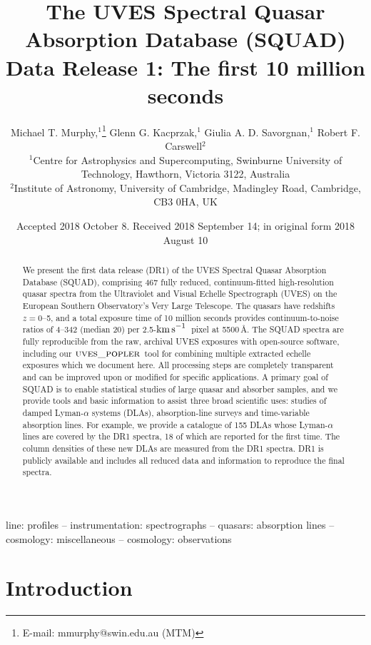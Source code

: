\documentclass[fleqn,usenatbib,usedcolumn]{mnras}
\title[UVES SQUAD Data Release 1]{The UVES Spectral Quasar Absorption Database (SQUAD) Data Release 1: The first 10 million seconds}
\author[M. T. Murphy et al.]{Michael T. Murphy,$^{1}$\thanks{E-mail: mmurphy@swin.edu.au (MTM)} Glenn G. Kacprzak,$^{1}$ Giulia A. D. Savorgnan,$^{1}$\newauthor
Robert F. Carswell$^{2}$\\
  $^{1}$Centre for Astrophysics and Supercomputing, Swinburne University of Technology, Hawthorn, Victoria 3122, Australia\\
  $^{2}$Institute of Astronomy, University of Cambridge, Madingley Road, Cambridge, CB3 0HA, UK
}
\date{Accepted 2018 October 8. Received 2018 September 14; in original form 2018 August 10}
\newcommand{\kms}{\ensuremath{\textrm{km\,s}^{-1}}}
\newcommand{\popler}{\ensuremath{\textsc{uves\_popler}}}
\begin{document}
\label{firstpage}
\pagerange{\pageref{firstpage}--\pageref{lastpage}}
\maketitle

\begin{abstract}
We present the first data release (DR1) of the UVES Spectral Quasar Absorption Database (SQUAD), comprising 467 fully reduced, continuum-fitted high-resolution quasar spectra from the Ultraviolet and Visual Echelle Spectrograph (UVES) on the European Southern Observatory's Very Large Telescope. The quasars have redshifts $z=0$--5, and a total exposure time of 10 million seconds provides continuum-to-noise ratios of 4--342 (median 20) per 2.5-\kms\ pixel at 5500\,\AA. The SQUAD spectra are fully reproducible from the raw, archival UVES exposures with open-source software, including our \popler\ tool for combining multiple extracted echelle exposures which we document here. All processing steps are completely transparent and can be improved upon or modified for specific applications. A primary goal of SQUAD is to enable statistical studies of large quasar and absorber samples, and we provide tools and basic information to assist three broad scientific uses: studies of damped Lyman-$\alpha$ systems (DLAs), absorption-line surveys and time-variable absorption lines. For example, we provide a catalogue of 155 DLAs whose Lyman-$\alpha$ lines are covered by the DR1 spectra, 18 of which are reported for the first time. The  column densities of these new DLAs are measured from the DR1 spectra. DR1 is publicly available and includes all reduced data and information to reproduce the final spectra.
\end{abstract}

\begin{keywords}
line: profiles -- instrumentation: spectrographs -- quasars: absorption lines -- cosmology: miscellaneous -- cosmology: observations
\end{keywords}



\section{Introduction}\label{s:intro}
\end{document}
